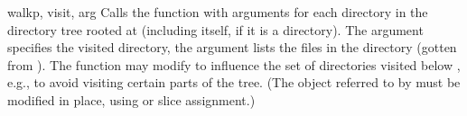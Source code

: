 \begin{funcdesc}{walk}{p, visit, arg}
Calls the function  with arguments
 for each directory in the
directory tree rooted at  (including  itself, if it is a
directory).  The argument  specifies the visited directory,
the argument  lists the files in the directory (gotten from
).
The  function may modify  to
influence the set of directories visited below , e.g., to
avoid visiting certain parts of the tree.  (The object referred to by
 must be modified in place, using  or slice
assignment.)
\end{funcdesc}
